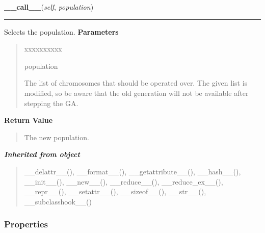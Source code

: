 \hspace{.8\funcindent}\begin{boxedminipage}{\funcwidth}

    \raggedright \textbf{\_\_call\_\_}(\textit{self}, \textit{population})

    \vspace{-1.5ex}

    \rule{\textwidth}{0.5\fboxrule}
\setlength{\parskip}{2ex}

Selects the population.
\setlength{\parskip}{1ex}
      \textbf{Parameters}
      \vspace{-1ex}

      \begin{quote}
        \begin{Ventry}{xxxxxxxxxx}

          \item[population]


The list of chromosomes that should be operated over. The given list
is modified, so be aware that the old generation will not be
available after stepping the GA.
        \end{Ventry}

      \end{quote}

      \textbf{Return Value}
    \vspace{-1ex}

      \begin{quote}

The new population.
      \end{quote}

    \end{boxedminipage}


\large{\textbf{\textit{Inherited from object}}}

\begin{quote}
\_\_delattr\_\_(), \_\_format\_\_(), \_\_getattribute\_\_(), \_\_hash\_\_(), \_\_init\_\_(), \_\_new\_\_(), \_\_reduce\_\_(), \_\_reduce\_ex\_\_(), \_\_repr\_\_(), \_\_setattr\_\_(), \_\_sizeof\_\_(), \_\_str\_\_(), \_\_subclasshook\_\_()
\end{quote}


  \subsubsection{Properties}

